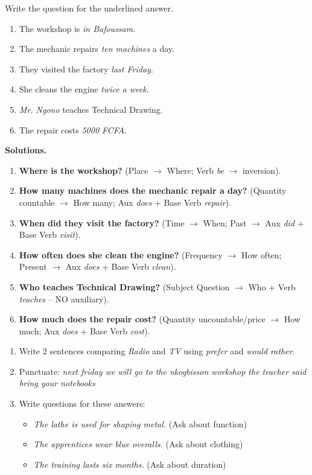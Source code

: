 \documentclass[11pt]{article}
\begin{document}
\begin{exoresolu}
Write the question for the underlined answer.
\begin{enumerate}
\item The workshop is \emph{in Bafoussam}.
\item The mechanic repairs \emph{ten machines} a day.
\item They visited the factory \emph{last Friday}.
\item She cleans the engine \emph{twice a week}.
\item \emph{Mr. Ngono} teaches Technical Drawing.
\item The repair costs \emph{5000 FCFA}.
\end{enumerate}
\tcblower
\textbf{Solutions.}
\begin{enumerate}
\item \textbf{Where is the workshop?} (Place $\rightarrow$ Where; Verb \emph{be} $\rightarrow$ inversion).
\item \textbf{How many machines does the mechanic repair a day?} (Quantity countable $\rightarrow$ How many; Aux \emph{does} + Base Verb \emph{repair}).
\item \textbf{When did they visit the factory?} (Time $\rightarrow$ When; Past $\rightarrow$ Aux \emph{did} + Base Verb \emph{visit}).
\item \textbf{How often does she clean the engine?} (Frequency $\rightarrow$ How often; Present $\rightarrow$ Aux \emph{does} + Base Verb \emph{clean}).
\item \textbf{Who teaches Technical Drawing?} (Subject Question $\rightarrow$ Who + Verb \emph{teaches} -- NO auxiliary).
\item \textbf{How much does the repair cost?} (Quantity uncountable/price $\rightarrow$ How much; Aux \emph{does} + Base Verb \emph{cost}).
\end{enumerate}
\end{exoresolu}

\begin{exercice}
\begin{enumerate}
\item Write 2 sentences comparing \emph{Radio} and \emph{TV} using \emph{prefer} and \emph{would rather}.
\item Punctuate: \emph{next friday we will go to the nkogbisson workshop the teacher said bring your notebooks}
\item Write questions for these answers:
\begin{itemize}
\item \emph{The lathe is used for shaping metal.} (Ask about function)
\item \emph{The apprentices wear blue overalls.} (Ask about clothing)
\item \emph{The training lasts six months.} (Ask about duration)
\end{itemize}
\end{enumerate}
\end{exercice}
\end{document}

